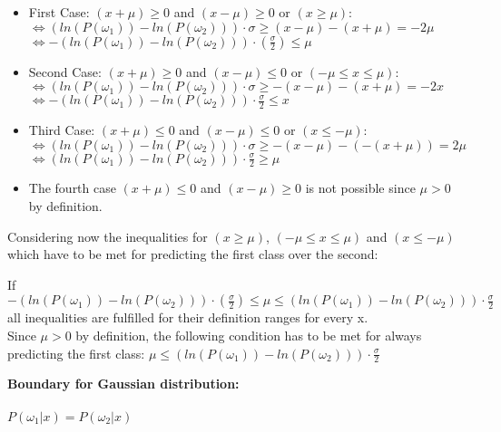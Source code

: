 \documentclass{article}
\begin{document}
\begin{description}
\begin{itemize}
    \item First Case: $(x+\mu) \geq 0$ and $(x - \mu) \geq 0$ or $(x \geq \mu)$:\\
    $\Leftrightarrow (ln(P(\omega_1)) - ln (P(\omega_2))) \cdot \sigma \geq (x-\mu) - (x+\mu) = - 2 \mu$ \\
    $\Leftrightarrow -(ln(P(\omega_1)) - ln (P(\omega_2))) \cdot (\frac{\sigma}{2}) \leq \mu$
    \item Second Case: $(x+\mu) \geq 0$ and $(x - \mu) \leq 0$ or $(-\mu \leq x \leq \mu)$:\\
    $\Leftrightarrow (ln(P(\omega_1)) - ln (P(\omega_2))) \cdot \sigma \geq -(x-\mu) - (x+\mu) = -2x$ \\
    $\Leftrightarrow -(ln(P(\omega_1)) - ln (P(\omega_2))) \cdot \frac{\sigma}{2} \leq  x$
    \item Third Case: $(x+\mu) \leq 0$ and $(x - \mu) \leq 0$ or $(x \leq -\mu)$:\\
    $\Leftrightarrow (ln(P(\omega_1)) - ln (P(\omega_2))) \cdot \sigma \geq -(x-\mu) - (-(x+\mu)) = 2\mu$\\
    $\Leftrightarrow (ln(P(\omega_1)) - ln (P(\omega_2))) \cdot \frac{\sigma}{2} \geq \mu$
    \item The fourth case $(x+\mu) \leq 0$ and $(x - \mu) \geq 0$ is not possible since $\mu > 0$ by definition.
\end{itemize}

Considering now the inequalities for $(x \geq \mu)$, $(-\mu \leq x \leq \mu)$ and $(x \leq -\mu)$ which have to be met for predicting the first class over the second:

\vspace{0.3cm}
If $-(ln(P(\omega_1)) - ln (P(\omega_2))) \cdot (\frac{\sigma}{2}) \leq \mu \leq (ln(P(\omega_1)) - ln (P(\omega_2))) \cdot \frac{\sigma}{2}$ all inequalities are fulfilled for their definition ranges for every x.\\
Since $\mu > 0$ by definition, the following condition has to be met for always predicting the first class:
 $\mu \leq (ln(P(\omega_1)) - ln (P(\omega_2))) \cdot \frac{\sigma}{2}$

\item[(c)]

\begin{description}
\item \textbf{Boundary for Gaussian distribution:}\\
\\
$P(\omega_1|x) = P(\omega_2|x)$


\end{description}
\end{description}
\end{document}
